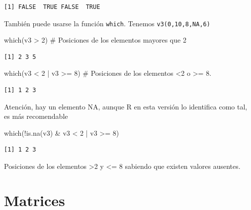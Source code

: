 \documentclass[
  letterpaper,
]{scrbook}
\newenvironment{Shaded}{\begin{snugshade}}{\end{snugshade}}
\newcommand{\CommentTok}[1]{\textcolor[rgb]{0.37,0.37,0.37}{#1}}
\newcommand{\DecValTok}[1]{\textcolor[rgb]{0.68,0.00,0.00}{#1}}
\newcommand{\FunctionTok}[1]{\textcolor[rgb]{0.28,0.35,0.67}{#1}}
\newcommand{\NormalTok}[1]{\textcolor[rgb]{0.00,0.23,0.31}{#1}}
\newcommand{\SpecialCharTok}[1]{\textcolor[rgb]{0.37,0.37,0.37}{#1}}
\begin{document}
\begin{verbatim}
[1] FALSE  TRUE FALSE  TRUE
\end{verbatim}

También puede usarse la función \texttt{which}. Tenemos
\texttt{v3(0,10,8,NA,6)}

\begin{Shaded}
\begin{Highlighting}[]
\FunctionTok{which}\NormalTok{(v3 }\SpecialCharTok{\textgreater{}} \DecValTok{2}\NormalTok{) }\CommentTok{\# Posiciones de los elementos mayores que 2}
\end{Highlighting}
\end{Shaded}

\begin{verbatim}
[1] 2 3 5
\end{verbatim}

\begin{Shaded}
\begin{Highlighting}[]
\FunctionTok{which}\NormalTok{(v3 }\SpecialCharTok{\textless{}} \DecValTok{2} \SpecialCharTok{|}\NormalTok{ v3 }\SpecialCharTok{\textgreater{}=} \DecValTok{8}\NormalTok{) }\CommentTok{\# Posiciones de los elementos \textless{}2 o \textgreater{}= 8.  }
\end{Highlighting}
\end{Shaded}

\begin{verbatim}
[1] 1 2 3
\end{verbatim}

Atención, hay un elemento NA, aunque R en esta versión lo identifica
como tal, es más recomendable

\begin{Shaded}
\begin{Highlighting}[]
\FunctionTok{which}\NormalTok{(}\SpecialCharTok{!}\FunctionTok{is.na}\NormalTok{(v3) }\SpecialCharTok{\&}\NormalTok{ v3 }\SpecialCharTok{\textless{}} \DecValTok{2} \SpecialCharTok{|}\NormalTok{ v3 }\SpecialCharTok{\textgreater{}=} \DecValTok{8}\NormalTok{) }
\end{Highlighting}
\end{Shaded}

\begin{verbatim}
[1] 1 2 3
\end{verbatim}

Posiciones de los elementos \textgreater2 y \textless= 8 sabiendo que
existen valores ausentes.

\hypertarget{matrices}{%
\chapter{Matrices}\label{matrices}}
\end{document}
